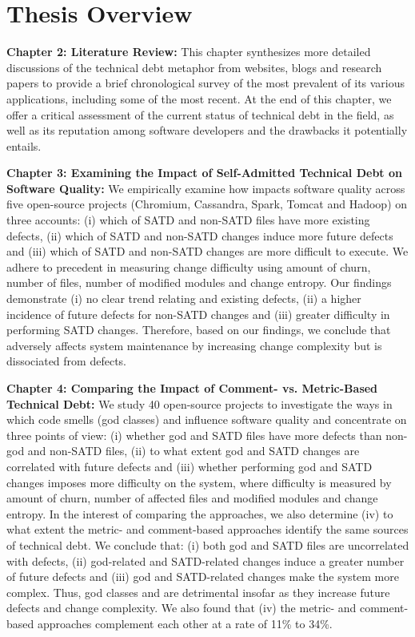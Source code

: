 \section{Thesis Overview}

\textbf{Chapter 2: Literature Review:} This chapter synthesizes more detailed discussions of the technical debt metaphor from websites, blogs and research papers to provide a brief chronological survey of the most prevalent of its various applications, including some of the most recent.  At the end of this chapter, we offer a critical assessment of the current status of technical debt in the field, as well as its reputation among software developers and the drawbacks it potentially entails.

\textbf{Chapter 3: Examining the Impact of Self-Admitted Technical Debt on Software Quality:} We empirically examine how \SATD impacts software quality across five open-source projects (Chromium, Cassandra, Spark, Tomcat and Hadoop) on three accounts: (i) which of SATD and non-SATD files have more existing defects, (ii) which of SATD and non-SATD changes induce more future defects and (iii) which of SATD and non-SATD changes are more difficult to execute. We adhere to precedent in measuring change difficulty using amount of churn, number of files, number of modified modules and change entropy. Our findings demonstrate (i) no clear trend relating \SATD and existing defects, (ii) a higher incidence of future defects for non-SATD changes and (iii) greater difficulty in performing SATD changes. Therefore, based on our findings, we conclude that \SATD adversely affects system maintenance by increasing change complexity but is dissociated from defects.

\textbf{Chapter 4: Comparing the Impact of Comment- vs. Metric-Based Technical Debt:} We study 40 open-source projects to investigate the ways in which code smells (god classes) and \SATD influence software quality and concentrate on three points of view: (i) whether god and SATD files have more defects than non-god and non-SATD files, (ii) to what extent god and SATD changes are correlated with future defects and (iii) whether performing god and SATD changes imposes more difficulty on the system, where difficulty is measured by amount of churn, number of affected files and modified modules and change entropy. In the interest of comparing the approaches, we also determine (iv) to what extent the metric- and comment-based approaches identify the same sources of technical debt. We conclude that: (i) both god and SATD files are uncorrelated with defects, (ii) god-related and SATD-related changes induce a greater number of future defects and (iii) god and SATD-related changes make the system more complex. Thus, god classes and \SATD are detrimental insofar as they increase future defects and change complexity. We also found that (iv) the metric- and comment-based approaches complement each other at a rate of 11\% to 34\%.


